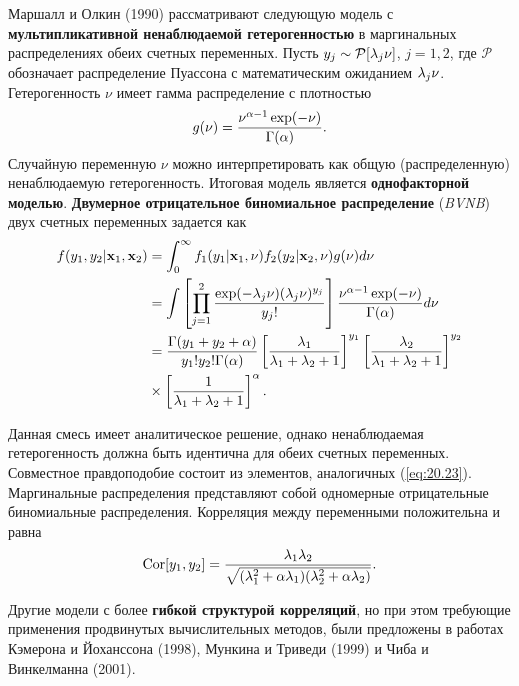 Маршалл и Олкин (1990) рассматривают следующую модель с \textbf{мультипликативной ненаблюдаемой гетерогенностью} в маргинальных распределениях обеих счетных переменных. Пусть $y_j \sim \mathcal{P}[\lambda_j\nu]$, $j = 1, 2$, где $\mathcal{P}$ обозначает распределение Пуассона с математическим ожиданием $\lambda_j\nu$. Гетерогенность $\nu$ имеет гамма распределение с плотностью
        $$g(\nu) = \frac{\nu^{\alpha - 1}\exp(-\nu)}{\Gamma(\alpha)}.$$
Случайную переменную $\nu$ можно интерпретировать как общую (распределенную) ненаблюдаемую гетерогенность. Итоговая модель является \textbf{однофакторной моделью}. \textbf{Двумерное отрицательное биномиальное распределение} (\textit{BVNB}) двух счетных переменных задается как
    \begin{align}\label{eq:20.23}
    f(y_1, y_2|\mathbf{x}_1, \mathbf{x}_2)  &= \int^{\infty}_{0} f_1(y_1|\mathbf{x}_1, \nu) f_2(y_2|\mathbf{x}_2, \nu) g(\nu) d\nu \\
                            &= \int \left[ \prod^2_{j = 1}\frac{\exp(-\lambda_j\nu)(\lambda_j\nu)^{y_j}}{y_j!}  \right] \frac{\nu^{\alpha - 1} \exp(-\nu)}{\Gamma(\alpha)} d\nu \notag \\
                            &= \frac{\Gamma(y_1 + y_2 + \alpha)}{y_1! y_2! \Gamma(\alpha)} \left[ \frac{\lambda_1}{\lambda_1 + \lambda_2 + 1} \right]^{y_1} \left[ \frac{\lambda_2}{\lambda_1 + \lambda_2 + 1} \right]^{y_2} \notag \\
                            &\times \left[ \frac{1}{\lambda_1 + \lambda_2 + 1} \right]^{\alpha}. \notag
    \end{align}

Данная смесь имеет аналитическое решение, однако ненаблюдаемая гетерогенность должна быть идентична для обеих счетных переменных. Совместное правдоподобие состоит из элементов, аналогичных (\ref{eq:20.23}). Маргинальные распределения представляют собой одномерные отрицательные биномиальные распределения. Корреляция между переменными положительна и равна
    \begin{align}\label{eq:20.24}
    \mathrm{Cor}[y_1, y_2] = \frac{\lambda_1 \lambda_2}{\sqrt{(\lambda_1^2 + \alpha \lambda_1)(\lambda_2^2 + \alpha \lambda_2)}}.
    \end{align}

Другие модели с более \textbf{гибкой структурой корреляций}, но при этом требующие применения продвинутых вычислительных методов, были предложены в работах Кэмерона и Йоханссона (1998), Мункина и Триведи (1999) и Чиба и Винкелманна (2001).

